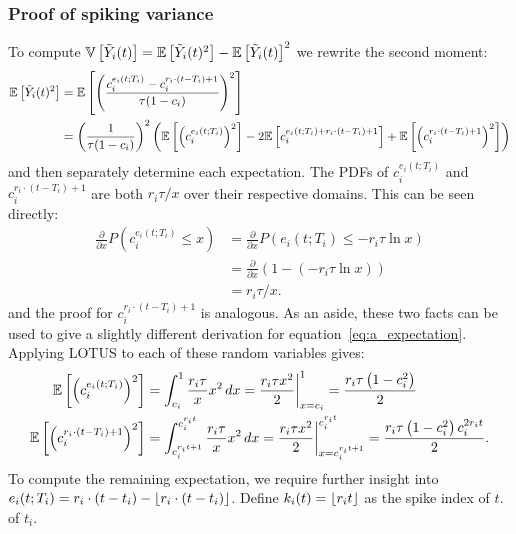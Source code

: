 \subsubsection{Proof of spiking variance}

To compute $\mathbb{V}\left[{\tilde{Y}_i(t)}\right] = \mathbb{E}\left[{\tilde{Y}_i(t)^2}\right] - \mathbb{E}\left[{\tilde{Y}_i(t)}\right]^2$ we rewrite the second moment:
\begin{align*}
\mathbb{E}\left[{\tilde{Y}_i(t)^2}\right] &= \mathbb{E}\left[{\left( \frac{c_i^{e_i(t; T_i)} - c_i^{r_i \cdot (t - T_i) + 1}}{\tau(1 - c_i)} \right)^2}\right] \\
&= \left( \frac{1}{\tau(1 - c_i)} \right)^2 \left( \mathbb{E}\left[{\left(c_i^{e_i(t; T_i)}\right)^2 }\right] - 2 \mathbb{E}\left[{c_i^{e_i(t; T_i) + r_i \cdot (t - T_i) + 1}}\right] + \mathbb{E}\left[{\left( c_i^{r_i \cdot (t - T_i) + 1} \right)^2}\right] \right)
\end{align*}
and then separately determine each expectation.
The PDFs of $c_i^{e_i(t; T_i)}$ and $c_i^{r_i \cdot (t - T_i) + 1}$ are both $r_i \tau / x$ over their respective domains. This can be seen directly:
\begin{align*}
\frac{\partial}{\partial x} P \left( c_i^{e_i(t; T_i)} \le x \right) &= \frac{\partial}{\partial x} P \left( e_i(t; T_i) \le -r_i \tau \ln x \right) \\
&= \frac{\partial}{\partial x} \left( 1 - (-r_i \tau \ln x) \right) \\
&= r_i \tau / x .
\end{align*}
and the proof for $c_i^{r_i \cdot (t - T_i) + 1}$ is analogous.
As an aside, these two facts can be used to give a slightly different derivation for equation~\ref{eq:a_expectation}.
Applying LOTUS to each of these random variables gives:
\begin{align*}
\mathbb{E}\left[{\left(c_i^{e_i(t; T_i)}\right)^2}\right] &= \int_{c_i}^1 \frac{r_i \tau}{x} x^2 \,dx = \frac{r_i \tau x^2}{2} \bigg|_{x = c_i}^1 = \frac{r_i \tau \left(1 - c_i^2 \right)}{2} \\
\mathbb{E}\left[{\left(c_i^{r_i \cdot (t - T_i) + 1}\right)^2}\right] &= \int_{c_i^{r_i t + 1}}^{c_i^{r_i t}} \frac{r_i \tau}{x} x^2 \,dx = \frac{r_i \tau x^2}{2} \bigg|_{x = c_i^{r_i t + 1}}^{c_i^{r_i t}} = \frac{r_i \tau \left(1 - c_i^2 \right) c_i^{2 r_i t}}{2} .
\end{align*}
To compute the remaining expectation, we require further insight into $e_i(t; T_i) = r_i \cdot (t - t_i) - \lfloor {r_i \cdot (t - t_i)} \rfloor$.
Define $k_i(t) = \lfloor {r_i t} \rfloor$ as the spike index of $t$. of $t_i$. %

